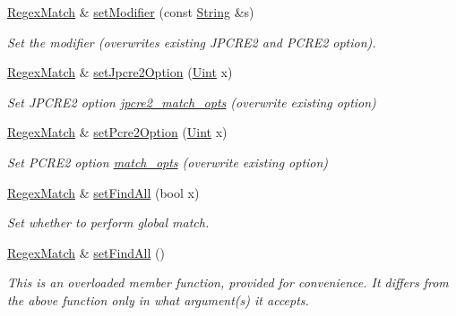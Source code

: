 \begin{DoxyCompactItemize}
\hyperlink{classjpcre2_1_1RegexMatch}{Regex\+Match} \& \hyperlink{classjpcre2_1_1RegexMatch_a9df7e92f96b61553f62720cb8f5f23e5}{set\+Modifier} (const \hyperlink{namespacejpcre2_a91f03070152fb228bc116c5a737f1d16}{String} \&s)
\begin{DoxyCompactList}\small\item\em Set the modifier (overwrites existing J\+P\+C\+R\+E2 and P\+C\+R\+E2 option). \end{DoxyCompactList}\item 
\hyperlink{classjpcre2_1_1RegexMatch}{Regex\+Match} \& \hyperlink{classjpcre2_1_1RegexMatch_a0d76033d9c134caa9ddfc21849603920}{set\+Jpcre2\+Option} (\hyperlink{namespacejpcre2_a078242d38221a13fb3543b9edd78c099}{Uint} x)
\begin{DoxyCompactList}\small\item\em Set J\+P\+C\+R\+E2 option \hyperlink{classjpcre2_1_1RegexMatch_a70d62df887eeed237724f64fbc378700}{jpcre2\+\_\+match\+\_\+opts} (overwrite existing option) \end{DoxyCompactList}\item 
\hyperlink{classjpcre2_1_1RegexMatch}{Regex\+Match} \& \hyperlink{classjpcre2_1_1RegexMatch_ae4ab558c2bec0bc9639dbca70ab47496}{set\+Pcre2\+Option} (\hyperlink{namespacejpcre2_a078242d38221a13fb3543b9edd78c099}{Uint} x)
\begin{DoxyCompactList}\small\item\em Set P\+C\+R\+E2 option \hyperlink{classjpcre2_1_1RegexMatch_a697d5731007350b0f20d2018fcfafa90}{match\+\_\+opts} (overwrite existing option) \end{DoxyCompactList}\item 
\hyperlink{classjpcre2_1_1RegexMatch}{Regex\+Match} \& \hyperlink{classjpcre2_1_1RegexMatch_ae586d43ec197c57c66086eeb4f8d83a1}{set\+Find\+All} (bool x)
\begin{DoxyCompactList}\small\item\em Set whether to perform global match. \end{DoxyCompactList}\item 
\hyperlink{classjpcre2_1_1RegexMatch}{Regex\+Match} \& \hyperlink{classjpcre2_1_1RegexMatch_a9e04456a81606362a2ecdf748912e3ea}{set\+Find\+All} ()
\begin{DoxyCompactList}\small\item\em This is an overloaded member function, provided for convenience. It differs from the above function only in what argument(s) it accepts.


\end{DoxyCompactList}
\end{DoxyCompactItemize}
